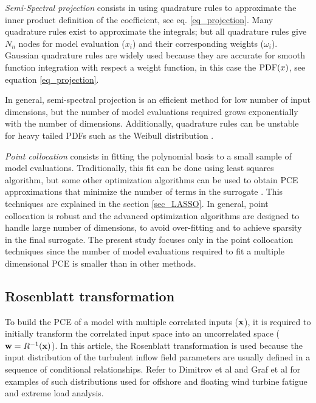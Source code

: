\documentclass[preprint,12pt]{elsarticle}
\begin{document}
\emph{Semi-Spectral projection} consists in using quadrature rules to approximate the inner product definition of the coefficient, see eq. \ref{eq_projection}. Many quadrature rules exist to approximate the integrals; but all quadrature rules give $N_n$ nodes for model evaluation ($x_i$) and their corresponding weights ($\omega_i$). Gaussian quadrature rules are widely used because they are accurate for smooth function integration with respect a weight function, in this case the $\mathrm{PDF}(x)$, see equation \ref{eq_projection}.


\noindent In general, semi-spectral projection is an efficient method for low number of input dimensions, but the number of model evaluations required grows exponentially with the number of dimensions. Additionally, quadrature rules can be unstable for heavy tailed PDFs such as the Weibull distribution \cite{gautschi1994algorithm}.

\emph{Point collocation} consists in fitting the polynomial basis to a small sample of model evaluations. Traditionally, this fit can be done using least squares algorithm, but some other optimization algorithms can be used to obtain PCE approximations that minimize the number of  terms in the surrogate \cite{blatman2011adaptive,pedregosa2011scikit,tibshirani1996regression}. This techniques are explained in the section \ref{sec_LASSO}. In general, point collocation is robust and the advanced optimization algorithms are designed to handle large number of dimensions, to avoid over-fitting and to achieve sparsity in the final surrogate. The present study focuses only in the point collocation techniques since the number of model evaluations required to fit a multiple dimensional PCE is smaller \cite{blatman2011adaptive} than in other methods.

\subsection{Rosenblatt transformation}

To build the PCE of a model with multiple correlated inputs ($\mathbf{x}$), it is required to initially transform the correlated input space into an uncorrelated space ($\mathbf{w}=R^{-1}(\mathbf{x})$). In this article, the Rosenblatt transformation is used because the input distribution of the turbulent inflow field parameters are usually defined in a sequence of conditional relationships. Refer to Dimitrov et al \cite{dimitrov2015model} and Graf et al \cite{graf2015high} for examples of such distributions used for offshore and floating wind turbine fatigue and extreme load analysis.
\end{document}

